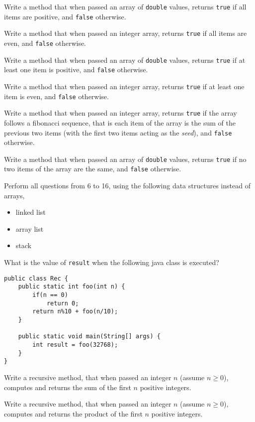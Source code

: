 \begin{questions}
\question Write a method that when passed an array of \texttt{double} values, returns \texttt{true} if all items are positive, and \texttt{false} otherwise.

\question Write a method that when passed an integer array, returns \texttt{true} if all items are even, and \texttt{false} otherwise.

\question Write a method that when passed an array of \texttt{double} values, returns \texttt{true} if at least one item is positive, and \texttt{false} otherwise.

\question Write a method that when passed an integer array, returns \texttt{true} if at least one item is even, and \texttt{false} otherwise.

\question Write a method that when passed an integer array, returns \texttt{true} if the array follows a fibonacci sequence, that is each item of the array is the sum of the previous two items (with the first two items acting as the \emph{seed}), and \texttt{false} otherwise.

\question Write a method that when passed an array of \texttt{double} values, returns \texttt{true} if no two items of the array are the same, and \texttt{false} otherwise.

\question Perform all questions from 6 to 16, using the following data structures instead of arrays,

\begin{itemize}
\item linked list
\item array list	
\item stack
\end{itemize}

\question What is the value of \texttt{result} when the following java class is executed?

\begin{lstlisting}
public class Rec {
	public static int foo(int n) {
		if(n == 0)
			return 0;
		return n%10 + foo(n/10);
	}
	
	public static void main(String[] args) {
		int result = foo(32768);
	}
}
\end{lstlisting}

\question Write a recursive method, that when passed an integer $n$ (assume $n \geq 0$), computes and returns the sum of the first $n$ positive integers.

\question Write a recursive method, that when passed an integer $n$ (assume $n \geq 0$), computes and returns the product of the first $n$ positive integers.


\end{questions}
